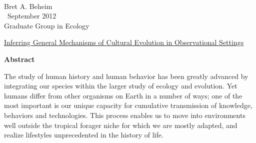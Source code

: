 \documentclass[letterpaper, 12pt, oneside]{book}
\begin{document}
    \newpage


    \doublespacing
    
       
    
    \tableofcontents
    
    \newpage
    
       
    

    ~\vspace{-1in} %
    \begin{flushright}
        \singlespacing
        Bret A. Beheim\\
        ~September 2012\\
        Graduate Group in Ecology
    \end{flushright}

    \centerline{\underline{Inferring General Mechanisms of Cultural Evolution in Observational Settings}}
    
    \centerline{\textbf{Abstract}}
    
     The study of human history and human behavior has been greatly advanced by integrating our species within the larger study of ecology and evolution.  Yet humans differ from other organisms on Earth in a number of ways; one of the most important is our unique capacity for cumulative transmission of knowledge, behaviors and technologies. This process enables us to move into environments well outside the tropical forager niche for which we are mostly adapted, and realize lifestyles unprecedented in the history of life.  
\end{document}
